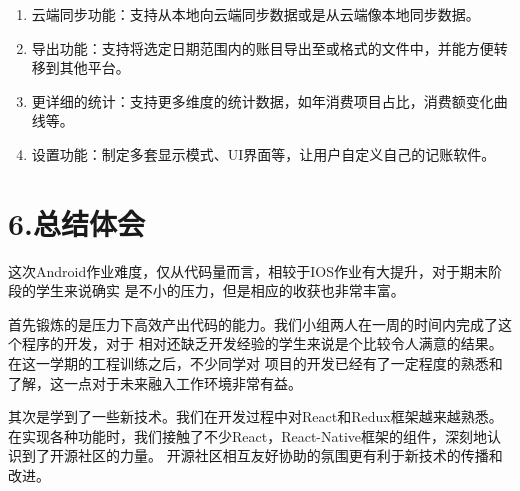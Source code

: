 \documentclass{article}
\begin{document}
\begin{enumerate}%

\item{}
云端同步功能：支持从本地向云端同步数据或是从云端像本地同步数据。%

\item{}
导出功能：支持将选定日期范围内的账目导出至或格式的文件中，并能方便转移到其他平台。%

\item{}
更详细的统计：支持更多维度的统计数据，如年消费项目占比，消费额变化曲线等。%

\item{}
设置功能：制定多套显示模式、UI界面等，让用户自定义自己的记账软件。%
\end{enumerate}%

\section{6.\hspace*{0.5em}总结体会}\label{section}%

\noindent{}这次Android作业难度，仅从代码量而言，相较于IOS作业有大提升，对于期末阶段的学生来说确实
是不小的压力，但是相应的收获也非常丰富。%

首先锻炼的是压力下高效产出代码的能力。我们小组两人在一周的时间内完成了这个程序的开发，对于
相对还缺乏开发经验的学生来说是个比较令人满意的结果。在这一学期的工程训练之后，不少同学对
项目的开发已经有了一定程度的熟悉和了解，这一点对于未来融入工作环境非常有益。%

其次是学到了一些新技术。我们在开发过程中对React和Redux框架越来越熟悉。
在实现各种功能时，我们接触了不少React，React-Native框架的组件，深刻地认识到了开源社区的力量。
开源社区相互友好协助的氛围更有利于新技术的传播和改进。%
\end{document}
